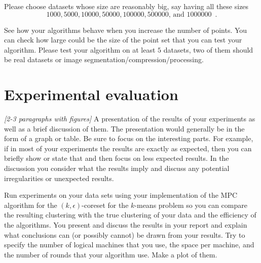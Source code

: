 \documentclass[11pt]{article}
\begin{document}
Please choose datasets whose size are reasonably big, say having all these sizes 
$$1000, 5000, 10000, 50000, 100000, 500000\text{, and } 1000000 \enspace. $$ 

See how your algorithms behave when you increase the number of points. 
You can check how large could be the size of the point set that you can test your algorithm. 
Please test your algorithm on at least $5$ datasets, two of them should be real datasets or image segmentation/compression/processing. 


\section{Experimental evaluation}
\label{se:evaluation}
\emph{[2-3 paragraphs with figures]}
A presentation of the results of your experiments as well as a brief discussion of them. The presentation would generally be in the form of a graph or table. Be sure to focus on the interesting parts. For example, if in most of your experiments the results are exactly as expected, then you can briefly show or state that and then focus on less expected results. In the discussion you consider what the results imply and discuss any potential irregularities or unexpected results.

Run experiments on your data sets using your implementation of the MPC algorithm for the $(k,\epsilon)$-coreset for the $k$-means problem 
so you can compare the resulting clustering with the true clustering of your data and the efficiency of the algorithms. 
You present and discuss the results in your report and explain what conclusions can (or possibly cannot) be drawn from your results. 
Try to specify the number of logical machines that you use, the space per machine, and the number of rounds that your algorithm use. Make a plot of them. 
\end{document}
